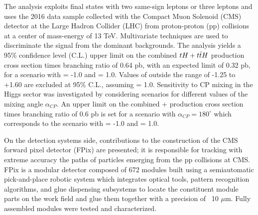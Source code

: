 The analysis exploits final states with two same-sign leptons or three leptons and uses the 2016 data sample collected with the Compact Muon Solenoid (CMS) detector at the Large Hadron Collider (LHC) from proton-proton (pp) collisions at a center of mass-energy of 13 TeV. Multivariate techniques are used to discriminate the signal from the dominant backgrounds. The analysis yields a 95\% confidence level (C.L.) upper limit on the combined ${tH + t\bar{t}H}$ production cross section times branching ratio of 0.64 pb, with an expected limit of 0.32 pb, for a scenario with \Ct = -1.0 and \CV = 1.0. Values of \Ct outside the range of -1.25 to +1.60 are excluded at 95\% C.L., assuming \CV = 1.0. Sensitivity to CP mixing in the Higgs sector was investigated by considering scenarios for different values of the mixing angle $\alpha_{CP}$. An upper limit on the combined \tH + \ttH production cross section times branching ratio of 0.6 pb is set for a scenario with $\alpha_{CP}=180^\circ$ which corresponds to the scenario with \Ct = -1.0 and \CV = 1.0.

On the detection systems side, contributions to the construction of the CMS forward pixel detector (FPix) are presented; it is responsible for tracking with extreme accuracy the paths of particles emerging from the pp collisions at CMS. FPix is a modular detector composed of 672 modules built using a semiautomatic pick-and-place robotic system which integrates optical tools, pattern recognition algorithms, and glue dispensing subsystems to locate the constituent module parts on the work field and glue them together with a precision of ~10 $\mu$m. Fully assembled modules were tested and characterized.
